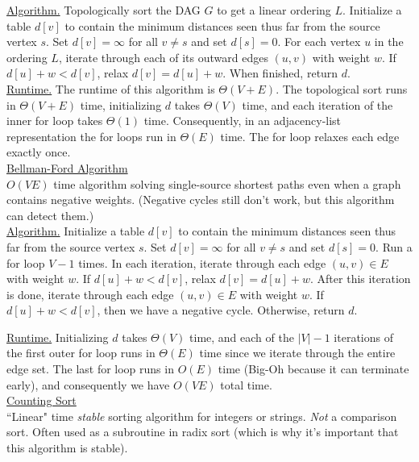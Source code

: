 \documentclass[12pt, fleqn]{general}
\begin{document}
\begin{multicols*}{2}
    \underline{Algorithm.} Topologically sort the DAG $G$ to get a linear ordering $L$. Initialize a table $d[v]$ to contain the minimum distances seen thus far from the source vertex $s$. Set $d[v] = \infty$ for all $v \neq s$ and set $d[s] = 0$. For each vertex $u$ in the ordering $L$, iterate through each of its outward edges $(u, v)$ with weight $w$. If $d[u] + w < d[v]$, relax $d[v] = d[u] + w$. When finished, return $d$.\\

    \underline{Runtime.} The runtime of this algorithm is $\Theta(V + E)$. The topological sort runs in $\Theta(V + E)$ time, initializing $d$ takes $\Theta(V)$ time, and each iteration of the inner for loop takes $\Theta(1)$ time. Consequently, in an adjacency-list representation the for loops run in $\Theta(E)$ time. The for loop relaxes each edge exactly once.\\

    {\large \underline{Bellman-Ford Algorithm}}\\

    $O(VE)$ time algorithm solving single-source shortest paths even when a graph contains negative weights. (Negative cycles still don't work, but this algorithm can detect them.)\\

    \underline{Algorithm.} Initialize a table $d[v]$ to contain the minimum distances seen thus far from the source vertex $s$. Set $d[v] = \infty$ for all $v \neq s$ and set $d[s] = 0$. Run a for loop $V - 1$ times. In each iteration, iterate through each edge $(u, v) \in E$ with weight $w$. If $d[u] + w < d[v]$, relax $d[v] = d[u] + w$. After this iteration is done, iterate through each edge $(u, v) \in E$ with weight $w$. If $d[u] + w < d[v]$, then we have a negative cycle.
    Otherwise, return $d$.

    \underline{Runtime.} Initializing $d$ takes $\Theta(V)$ time, and each of the $|V| - 1$ iterations of the first outer for loop runs in $\Theta(E)$ time since we iterate through the entire edge set. The last for loop runs in $O(E)$ time (Big-Oh because it can terminate early), and consequently we have $O(VE)$ total time.\\

    {\large \underline{Counting Sort}}\\

    ``Linear" time \emph{stable} sorting algorithm for integers or strings. \emph{Not} a comparison sort. Often used as a subroutine in radix sort (which is why it's important that this algorithm is stable).\\


\end{multicols*}
\end{document}
